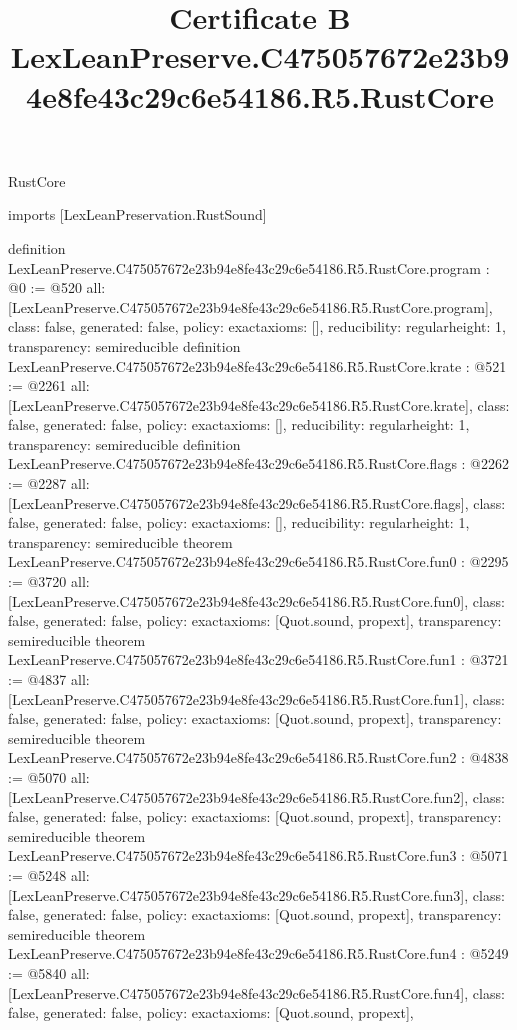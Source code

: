 \begin{lexlean}{RustCore}
\title{Certificate B LexLeanPreserve.C475057672e23b94e8fe43c29c6e54186.R5.RustCore}
\begin{coremodule}
imports [LexLeanPreservation.RustSound]

definition LexLeanPreserve.C475057672e23b94e8fe43c29c6e54186.R5.RustCore.program : @0 := @520 {
  all: [LexLeanPreserve.C475057672e23b94e8fe43c29c6e54186.R5.RustCore.program],
  class: false,
  generated: false,
  policy: exact{axioms: []},
  reducibility: regular{height: 1},
  transparency: semireducible
}
definition LexLeanPreserve.C475057672e23b94e8fe43c29c6e54186.R5.RustCore.krate : @521 := @2261 {
  all: [LexLeanPreserve.C475057672e23b94e8fe43c29c6e54186.R5.RustCore.krate],
  class: false,
  generated: false,
  policy: exact{axioms: []},
  reducibility: regular{height: 1},
  transparency: semireducible
}
definition LexLeanPreserve.C475057672e23b94e8fe43c29c6e54186.R5.RustCore.flags : @2262 := @2287 {
  all: [LexLeanPreserve.C475057672e23b94e8fe43c29c6e54186.R5.RustCore.flags],
  class: false,
  generated: false,
  policy: exact{axioms: []},
  reducibility: regular{height: 1},
  transparency: semireducible
}
theorem LexLeanPreserve.C475057672e23b94e8fe43c29c6e54186.R5.RustCore.fun0 : @2295 := @3720 {
  all: [LexLeanPreserve.C475057672e23b94e8fe43c29c6e54186.R5.RustCore.fun0],
  class: false,
  generated: false,
  policy: exact{axioms: [Quot.sound, propext]},
  transparency: semireducible
}
theorem LexLeanPreserve.C475057672e23b94e8fe43c29c6e54186.R5.RustCore.fun1 : @3721 := @4837 {
  all: [LexLeanPreserve.C475057672e23b94e8fe43c29c6e54186.R5.RustCore.fun1],
  class: false,
  generated: false,
  policy: exact{axioms: [Quot.sound, propext]},
  transparency: semireducible
}
theorem LexLeanPreserve.C475057672e23b94e8fe43c29c6e54186.R5.RustCore.fun2 : @4838 := @5070 {
  all: [LexLeanPreserve.C475057672e23b94e8fe43c29c6e54186.R5.RustCore.fun2],
  class: false,
  generated: false,
  policy: exact{axioms: [Quot.sound, propext]},
  transparency: semireducible
}
theorem LexLeanPreserve.C475057672e23b94e8fe43c29c6e54186.R5.RustCore.fun3 : @5071 := @5248 {
  all: [LexLeanPreserve.C475057672e23b94e8fe43c29c6e54186.R5.RustCore.fun3],
  class: false,
  generated: false,
  policy: exact{axioms: [Quot.sound, propext]},
  transparency: semireducible
}
theorem LexLeanPreserve.C475057672e23b94e8fe43c29c6e54186.R5.RustCore.fun4 : @5249 := @5840 {
  all: [LexLeanPreserve.C475057672e23b94e8fe43c29c6e54186.R5.RustCore.fun4],
  class: false,
  generated: false,
  policy: exact{axioms: [Quot.sound, propext]},
}
\end{coremodule}
\end{lexlean}
